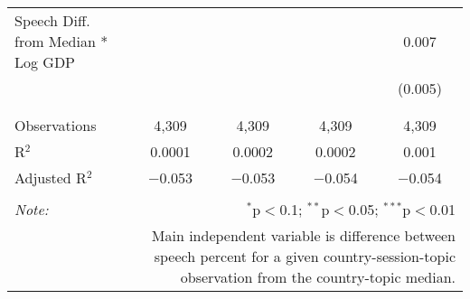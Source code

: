 \begin{table}[!htbp]
\begin{tabular}{@{\extracolsep{5pt}}lcccc}
 Speech Diff. from Median * Log GDP &  &  &  & 0.007 \\ 
  &  &  &  & (0.005) \\ 
  & & & & \\ 
\hline \\[-1.8ex] 
Observations & 4,309 & 4,309 & 4,309 & 4,309 \\ 
R$^{2}$ & 0.0001 & 0.0002 & 0.0002 & 0.001 \\ 
Adjusted R$^{2}$ & $-$0.053 & $-$0.053 & $-$0.054 & $-$0.054 \\ 
\hline 
\hline \\[-1.8ex] 
\textit{Note:}  & \multicolumn{4}{r}{$^{*}$p$<$0.1; $^{**}$p$<$0.05; $^{***}$p$<$0.01} \\ 
 & \multicolumn{4}{r}{Main independent variable is difference between speech percent for a given country-session-topic observation from the country-topic median.} \\ 
\end{tabular} 
\end{table} 
